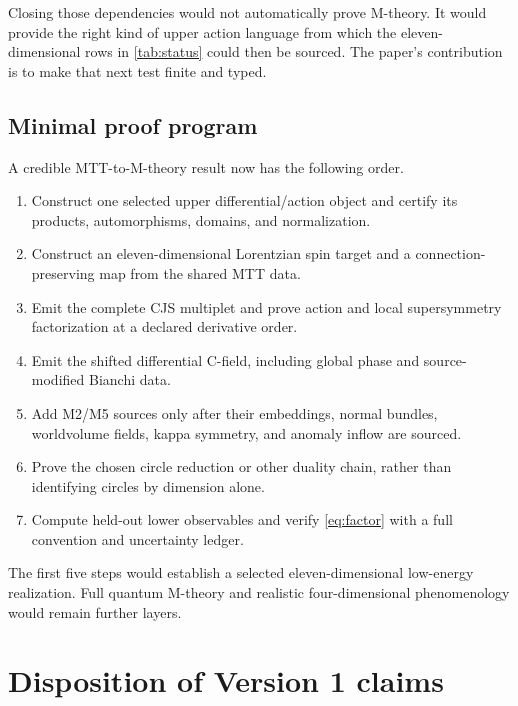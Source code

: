 \documentclass[11pt]{article}
\theoremstyle{definition}
\theoremstyle{remark}
\begin{document}
Closing those dependencies would not automatically prove M-theory.  It would
provide the right kind of upper action language from which the
eleven-dimensional rows in \cref{tab:status} could then be sourced.  The
paper's contribution is to make that next test finite and typed.

\subsection{Minimal proof program}

A credible MTT-to-M-theory result now has the following order.
\begin{enumerate}[leftmargin=1.7em]
\item Construct one selected upper differential/action object and certify
      its products, automorphisms, domains, and normalization.
\item Construct an eleven-dimensional Lorentzian spin target and a
      connection-preserving map from the shared MTT data.
\item Emit the complete CJS multiplet and prove action and local
      supersymmetry factorization at a declared derivative order.
\item Emit the shifted differential C-field, including global phase and
      source-modified Bianchi data.
\item Add M2/M5 sources only after their embeddings, normal bundles,
      worldvolume fields, kappa symmetry, and anomaly inflow are sourced.
\item Prove the chosen circle reduction or other duality chain, rather than
      identifying circles by dimension alone.
\item Compute held-out lower observables and verify
      \cref{eq:factor} with a full convention and uncertainty ledger.
\end{enumerate}

The first five steps would establish a selected eleven-dimensional
low-energy realization.  Full quantum M-theory and realistic
four-dimensional phenomenology would remain further layers.

\section{Disposition of Version 1 claims}
\label{sec:disposition}
\end{document}
